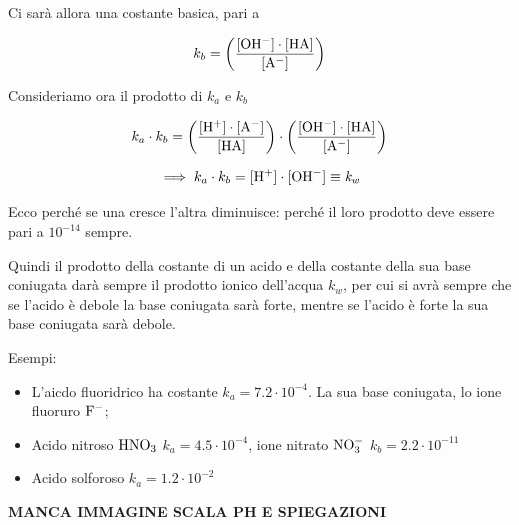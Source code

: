 Ci sarà allora una costante basica, pari a

$$k_b = \left( \rm \frac{[OH^-] \cdot [HA]}{[A^-]} \right)$$

Consideriamo ora il prodotto di $k_a$ e $k_b$

$$k_a \cdot k_b = \left( \rm \frac{[H^+] \cdot [A^-]}{[HA]} \right) \cdot \left( \rm \frac{[OH^-] \cdot [HA]}{[A^-]} \right)$$

$$\implies k_a \cdot k_b = \rm [H^+] \cdot [OH^-] \equiv \textit{k}_\textit{w}$$

Ecco perché se una cresce l'altra diminuisce: perché il loro prodotto deve essere pari a $10^{-14}$ sempre.

Quindi il prodotto della costante di un acido e della costante della sua base coniugata darà sempre il prodotto ionico dell'acqua $k_w$, per cui si avrà sempre che se l'acido è debole la base coniugata sarà forte, mentre se l'acido è forte la sua base coniugata sarà debole.

\vspace{0.2cm}Esempi:
\begin{itemize}
    \item L'aicdo fluoridrico ha costante $k_a=7.2 \cdot 10^{-4}$. La sua base coniugata, lo ione fluoruro $\rm F^-$;
    \item Acido nitroso $\rm HNO_3$ $k_a=4.5 \cdot 10^{-4}$, ione nitrato $\rm NO_3^-$ $k_b=2.2 \cdot 10^{-11}$
    \item Acido solforoso  $k_a=1.2 \cdot 10^{-2}$
\end{itemize}

\textbf{MANCA IMMAGINE SCALA PH E SPIEGAZIONI}